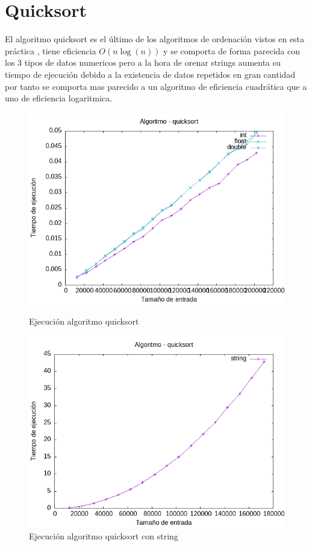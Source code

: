 \documentclass[11pt,openany]{book}
\begin{document}
\section*{Quicksort}
El algoritmo quicksort es el último de los algoritmos de ordenación vistos en esta práctica , tiene eficiencia $O(n\log(n))$ y se comporta de
forma parecida con los 3 tipos de datos numericos pero  a la hora de orenar strings aumenta su tiempo de ejecución debido a la existencia de datos repetidos
en gran cantidad por tanto se comporta mas parecido a un algoritmo de eficiencia cuadrática que a uno de eficiencia logaritmica.
\begin{figure}[H]
    \begin{minipage}{0.5\textwidth}
        \centering
        \includegraphics[width=\linewidth]{assets/Img/quicksort.png}
        \caption{Ejecución algoritmo quicksort}
        \label{fig:quicksort}
    \end{minipage}%
    \begin{minipage}{0.5\textwidth}
        \centering
        \includegraphics[width=\linewidth]{assets/Img/quicksortstring.png}
        \caption{Ejecución algoritmo quicksort con string}
        \label{fig:quicksortstring}
    \end{minipage}
\end{figure}
\end{document}
